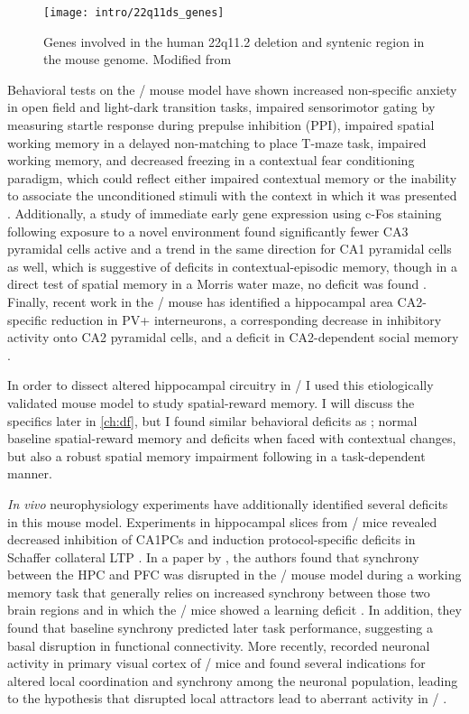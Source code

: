 \begin{figure}
	\centering
	\texttt{[image: intro/22q11ds\_genes]}
	\caption[Genetic deletion in 22q11.2DS and \df/]{Genes involved in the human 22q11.2 deletion and syntenic region in the mouse genome. Modified from \citet{Karayiorgou2010}}
	\label{fig:intro:scz:22q11_genes}
\end{figure}

Behavioral tests on the \df/ mouse model have shown increased non-specific anxiety in open field and light-dark transition tasks, impaired sensorimotor gating by measuring startle response during prepulse inhibition (PPI), impaired spatial working memory in a delayed non-matching to place T-maze task, impaired working memory, and decreased freezing in a contextual fear conditioning paradigm, which could reflect either impaired contextual memory or the inability to associate the unconditioned stimuli with the context in which it was presented \citep{Drew2011b, Stark2008, Sigurdsson2010}.
Additionally, a study of immediate early gene expression using c-Fos staining following exposure to a novel environment found significantly fewer CA3 pyramidal cells active and a trend in the same direction for CA1 pyramidal cells as well, which is suggestive of deficits in contextual-episodic memory, though in a direct test of spatial memory in a Morris water maze, no deficit was found \citep{Drew2011b}.
Finally, recent work in the \df/ mouse has identified a hippocampal area CA2-specific reduction in PV+ interneurons, a corresponding decrease in inhibitory activity onto CA2 pyramidal cells, and a deficit in CA2-dependent social memory \citep{Piskorowski2016}.

In order to dissect altered hippocampal circuitry in \scz/ I used this etiologically validated mouse model to study spatial-reward memory.
I will discuss the specifics later in \autoref{ch:df}, but I found similar behavioral deficits as \citeauthor{Drew2011b}; normal baseline spatial-reward memory and deficits when faced with contextual changes, but also a robust spatial memory impairment following in a task-dependent manner.

\emph{In vivo} neurophysiology experiments have additionally identified several deficits in this mouse model.
Experiments in hippocampal slices from \df/ mice revealed decreased inhibition of CA1PCs and induction protocol-specific deficits in Schaffer collateral LTP \citep{Drew2011b}.
In a paper by \citeauthor{Sigurdsson2010}, the authors found that synchrony between the \ac{HPC} and \ac{PFC} was disrupted in the \df/ mouse model during a working memory task that generally relies on increased synchrony between those two brain regions and in which the \df/ mice showed a learning deficit \citep{Sigurdsson2010}.
In addition, they found that baseline synchrony predicted later task performance, suggesting a basal disruption in functional connectivity.
More recently, \citeauthor{Hamm2017} recorded neuronal activity in primary visual cortex of \df/ mice and found several indications for altered local coordination and synchrony among the neuronal population, leading to the hypothesis that disrupted local attractors lead to aberrant activity in \scz/ \citep{Hamm2017}.

